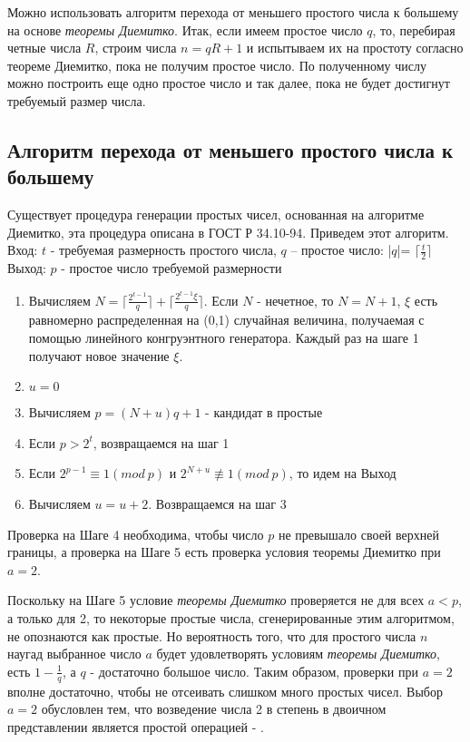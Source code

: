   Можно использовать алгоритм перехода от меньшего простого числа к большему на основе \textit{теоремы Диемитко}.
  Итак, если имеем простое число {$q$}, то, перебирая четные числа {$R$}, строим числа {$n = q R + 1$} и испытываем их на 
  простоту согласно теореме Диемитко, пока не получим простое число. По полученному числу можно построить еще одно простое число и так далее,
  пока не будет достигнут требуемый размер числа. 

  
  \subsection{Алгоритм перехода от меньшего простого числа к большему}
    Существует процедура генерации простых чисел, основанная на алгоритме Диемитко, эта процедура описана в ГОСТ Р 34.10-94. Приведем этот алгоритм.\\
    Вход: {$t$} - требуемая размерность простого числа, {$q$} – простое число: |{$q$}|= {$\lceil \frac{t}{2} \rceil$}
    Выход: {$p$} - простое число требуемой размерности
    
      \begin{enumerate}
      	\item Вычисляем {$N = \lceil \frac{2^{ t - 1}}{q} \rceil + \lceil \frac{2^{ t - 1} \xi}{q} \rceil$}. 
      	Если {$N$} - нечетное, то {$N = N + 1$}, {$\xi$} есть равномерно распределенная на (0,1) случайная величина, получаемая с помощью 
      	линейного конгруэнтного генератора. Каждый раз на шаге 1 получают новое значение {$\xi$}.
      	\item {$u = 0$}
      	\item Вычисляем {$p = (N + u)q + 1$} - кандидат в простые
      	\item Если {$p > 2^{ t}$}, возвращаемся на шаг 1
      	\item Если {$2^{ p - 1} \equiv 1(mod \: p)$} и {$2^{ N+u} \not\equiv 1(mod \: p)$}, то идем на Выход
      	\item Вычисляем {$u = u + 2$}. Возвращаемся на шаг 3
      \end{enumerate}
      
      Проверка на Шаге 4 необходима, чтобы число {$p$} не превышало своей верхней границы, а проверка на Шаге 5 есть проверка условия 
      теоремы Диемитко при {$a=2$}. 
      
      Поскольку на Шаге 5 условие \textit{теоремы Диемитко} проверяется не для всех {$a<p$}, а только для 2, то некоторые простые числа, 
      сгенерированные этим алгоритмом, не опознаются как простые. Но вероятность того, что для простого числа {$n$} наугад выбранное 
      число $a$ будет удовлетворять условиям \textit{теоремы Диемитко}, есть {$1 - \frac{1}{q}$}, а {$q$} - достаточно большое число. Таким образом, проверки
      при {$a=2$} вполне достаточно, чтобы не отсеивать слишком много простых чисел. Выбор {$a=2$} обусловлен тем, что возведение числа 2 
      в степень в двоичном представлении является простой операцией - \cite[Глава 3, страница 32]{niss2009}.
      
